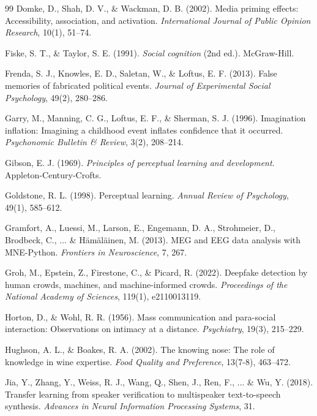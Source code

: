 \documentclass[12pt, a4paper]{article}
\begin{document}
\begin{thebibliography}{99}
Domke, D., Shah, D. V., \& Wackman, D. B. (2002). Media priming effects: Accessibility, association, and activation. \textit{International Journal of Public Opinion Research}, 10(1), 51--74.

Fiske, S. T., \& Taylor, S. E. (1991). \textit{Social cognition} (2nd ed.). McGraw-Hill.

Frenda, S. J., Knowles, E. D., Saletan, W., \& Loftus, E. F. (2013). False memories of fabricated political events. \textit{Journal of Experimental Social Psychology}, 49(2), 280--286.

Garry, M., Manning, C. G., Loftus, E. F., \& Sherman, S. J. (1996). Imagination inflation: Imagining a childhood event inflates confidence that it occurred. \textit{Psychonomic Bulletin \& Review}, 3(2), 208--214.

Gibson, E. J. (1969). \textit{Principles of perceptual learning and development}. Appleton-Century-Crofts.

Goldstone, R. L. (1998). Perceptual learning. \textit{Annual Review of Psychology}, 49(1), 585--612.

Gramfort, A., Luessi, M., Larson, E., Engemann, D. A., Strohmeier, D., Brodbeck, C., ... \& H\"{a}m\"{a}l\"{a}inen, M. (2013). MEG and EEG data analysis with MNE-Python. \textit{Frontiers in Neuroscience}, 7, 267.

Groh, M., Epstein, Z., Firestone, C., \& Picard, R. (2022). Deepfake detection by human crowds, machines, and machine-informed crowds. \textit{Proceedings of the National Academy of Sciences}, 119(1), e2110013119.

Horton, D., \& Wohl, R. R. (1956). Mass communication and para-social interaction: Observations on intimacy at a distance. \textit{Psychiatry}, 19(3), 215--229.

Hughson, A. L., \& Boakes, R. A. (2002). The knowing nose: The role of knowledge in wine expertise. \textit{Food Quality and Preference}, 13(7-8), 463--472.

Jia, Y., Zhang, Y., Weiss, R. J., Wang, Q., Shen, J., Ren, F., ... \& Wu, Y. (2018). Transfer learning from speaker verification to multispeaker text-to-speech synthesis. \textit{Advances in Neural Information Processing Systems}, 31.


\end{thebibliography}
\end{document}
